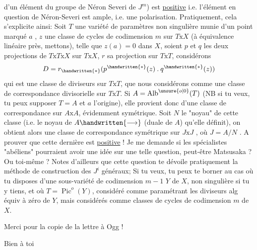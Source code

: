 d'un élément du groupe de Néron Severi de $J^m$) est \uline{positive} i.e. l'élément en question de Néron-Severi est ample, i.e. une polarisation. Pratiquement, cela s'explicite ainsi: Soit $T$ une variété de paramètres  non singulière munie d'un point marqué $a$ , $z$ une classe de cycles de codimension $m$ sur $T\mathbin{\mathrm{x}}X$ (à équivalence linéaire près, mettons), telle que $z(a)=0$ dans $X$, soient $p$ et $q$ les deux projections de $T\mathbin{\mathrm{x}}T\mathbin{\mathrm{x}}X$ sur $T\mathbin{\mathrm{x}}X$, $r$ sa projection sur $T\mathbin{\mathrm{x}}T$, considérons
\[
D=r_{\handwritten{*}}(p^{\handwritten{*}}(z)\mathbin{.}q^{\handwritten{*}}(z))
\]
qui est une classe de diviseurs sur $T\mathbin{\mathrm{x}}T$, que nous considérons comme une classe de correspondance divisorielle sur $T\mathbin{\mathrm{x}}T$. Si $A=\operatorname{Alb}^{\unsure{o|0}}(T)$ (NB si tu veux, tu peux supposer $T=A$ et $a$ l'origine), elle provient donc d'une classe de correspondance sur $A\mathbin{\mathrm{x}}A$, évidemment symétrique. Soit $N$ le "noyau" de cette classe (i.e. le noyau de $A\handwritten{\longrightarrow}$ (duale de $A$) qu'elle définit), on obtient alors une classe de correspondance symétrique sur $J\mathbin{\mathrm{x}}J$ , où $J=A/N$ . A prouver que cette dernière est \uline{positive} ! Je me demande si les spécialistes "abéliens" pourraient avoir une idée sur une telle question, peut-être Matsusaka ? Ou toi-même ? Notes d'ailleurs que cette question te dévoile pratiquement la méthode de construction des $J^i$ généraux; Si tu veux, tu peux te borner  au cas où tu disposes d'une sous-variété de codimension $m-1$ $Y$ de $X$, non singulière si tu y tiens,  et où $T=\operatorname{Pic}^{o}(Y)$, considéré comme paramétrant les diviseurs alg équiv à zéro de $Y$, mais considérés comme classes de cycles  de codimension $m$ de $X$.

Merci pour la copie de la lettre à Ogg !

Bien à toi\\

